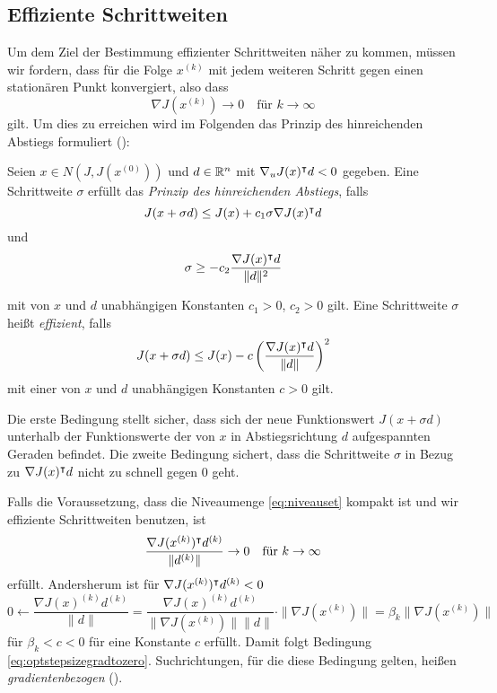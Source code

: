 \subsection{Effiziente Schrittweiten}
Um dem Ziel der Bestimmung effizienter Schrittweiten näher zu kommen, müssen wir fordern, dass für die Folge $x^{(k)}$ mit jedem weiteren Schritt gegen einen stationären Punkt konvergiert, also dass  
\begin{equation}
\label{eq:optstepsizegradtozero}
 \nabla J(x^{(k)})\to 0 \quad \text{für }k\to \infty
\end{equation}
gilt.
Um dies zu erreichen wird im Folgenden das Prinzip des hinreichenden Abstiegs formuliert (\cite[Def. 4.4.2]{alt2002nichtlineare}):
\begin{definition}
\label{def:sufficientdescent}
 Seien $x\in N(J,J(x^{(0)}))$ und $d\in \mathbb{R}^n$ mit $\nabla_u J(x)^\intercal d<0$ gegeben. Eine Schrittweite $\sigma$ erfüllt das \textit{Prinzip des hinreichenden Abstiegs}, falls
 \begin{equation}
 \label{eq:armijo1}
  J(x+\sigma d) \leq J(x) + c_1\sigma \nabla J(x)^\intercal d
 \end{equation}
 und 
 \begin{equation}
\label{eq:armijo2}
 \sigma \geq -c_2 \frac{\nabla J(x)^\intercal d}{\|d\|^2}
 \end{equation}


mit von $x$ und $d$ unabhängigen Konstanten $c_1>0$, $c_2>0$ gilt. Eine Schrittweite $\sigma$ heißt \textit{effizient}, falls
\[
 J(x+\sigma d) \leq J(x) - c\left( \frac{\nabla J(x)^\intercal d}{\|d\|}\right)^2
\]
mit einer von $x$ und $d$ unabhängigen Konstanten $c>0$ gilt.
\end{definition}
Die erste Bedingung stellt sicher, dass sich der neue Funktionswert $J(x+\sigma d)$ unterhalb der Funktionswerte der von $x$ in Abstiegsrichtung $d$ aufgespannten Geraden befindet. 
Die zweite Bedingung sichert, dass die Schrittweite $\sigma$ in Bezug zu $\nabla J(x)^\intercal d$ nicht zu schnell gegen $0$ geht.

Falls die Voraussetzung, dass die Niveaumenge \eqref{eq:niveauset} kompakt ist und wir effiziente Schrittweiten benutzen, ist
\[
 \frac{\nabla J(x^{(k)})^\intercal d^{(k)}}{\|d^{(k)}\|} \to 0 \quad \text{für }k\to \infty
\]
erfüllt. Andersherum ist für $\nabla J(x^{(k)})^\intercal d^{(k)}<0$
\[
 0 \leftarrow \frac{\nabla J(x)^{(k)} d^{(k)}}{\|d\|} = \frac{\nabla J(x)^{(k)} d^{(k)}}{\|\nabla J(x^{(k)})\|\|d\|}\cdot \|\nabla J(x^{(k)})\| = \beta_k \|\nabla J(x^{(k)})\|
\]
für $\beta_k<c<0$ für eine Konstante $c$ erfüllt. Damit folgt Bedingung \eqref{eq:optstepsizegradtozero}. Suchrichtungen, für die diese Bedingung gelten, heißen \textit{gradientenbezogen} (\cite[Def. 4.4.4]{alt2002nichtlineare}).

